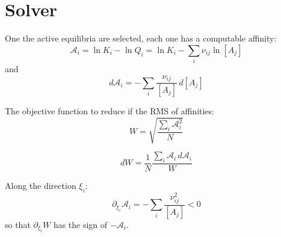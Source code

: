 \documentclass[aps,12pt]{revtex4}
\begin{document}
\section{Solver}

One the active equilibria are selected, each one has a computable 
affinity:
\begin{equation}
\label{eq:affinity}
	\mathcal A_i = \ln K_i - \ln Q_i = \ln K_i -  \sum_{i} \nu_{ij} \ln [A_j] %
\end{equation}
and
\begin{equation}
	d \mathcal A_i = - \sum_i \dfrac{\nu_{ij}}{[A_j]} \, d[A_j]
\end{equation}

The objective function to reduce if the RMS of affinities:
\begin{equation}
	W = \sqrt{ \dfrac{\sum_i \mathcal A_i^2}{N} } 
\end{equation}

\begin{equation}
	dW = \dfrac{1}{N} \dfrac{\sum_i \mathcal A_i \, d \mathcal A_i}{W}
\end{equation}

Along the direction $\xi_i$:
\begin{equation}
	\partial_{\xi_i} \mathcal A_i = - \sum_i \dfrac{\nu_{ij}^2}{[A_j]} < 0
\end{equation}
so that $\partial_{\xi_i} W$ has the sign of $-\mathcal A_i$.
\end{document}
